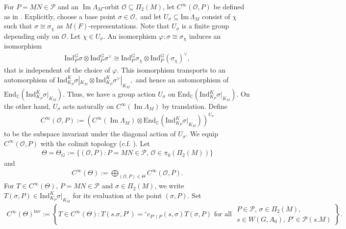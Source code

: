 \documentclass[10pt]{amsart}
\theoremstyle{definition}
\numberwithin{equation}{section}
\numberwithin{equation}{subsection}
\newcommand{\Ind}{\mathrm{Ind}}
\newcommand{\CC}{\mathbb{C}}
\renewcommand{\Im}{\mathop{\mathrm{Im}}}
\begin{document}
For $P=MN\in\mathcal{P}$ and an $\Im\Lambda_M$-orbit $\mathcal{O}\subseteq\Pi_2(M)$, let $C^\infty(\mathcal{O},P)$ be defined as in \cite[p.296]{Waldspurger:Plancherel}. Explicitly, choose a base point $\sigma\in \mathcal{O},$ and let $U_\sigma\subseteq \mathrm{Im}\, \Lambda_M$ consist of $\chi$ such that $\sigma\cong \sigma_\chi$ as $M(F)$-representations. Note that $U_\sigma$ is a finite group depending only on $\mathcal{O}$. Let $\chi\in U_\sigma.$ An isomorphism $\varphi:\sigma\cong \sigma_\chi$ induces an isomorphism 
\begin{align*}
    \mathrm{Ind}_P^G\sigma\otimes\Ind_P^{G} \sigma^\lor\cong \mathrm{Ind}_P^G \sigma_\chi\otimes \Ind_{P}^G(\sigma_\chi)^\lor,
\end{align*} 
that is independent of the choice of $\varphi.$ This isomorphism transports to an automorphism of $\Ind_{K_P}^K \sigma|_{K_M}\otimes \Ind_{K_P}^K \sigma^\lor|_{K_M},$ and hence an automorphism of $\mathrm{End}_\CC(\Ind_{K_P}^K \sigma|_{K_M}).$ Thus, we have a group action $U_\sigma$ on $\mathrm{End}_\CC(\Ind_{K_P}^K \sigma|_{K_M}).$ On the other hand, $U_\sigma$ acts naturally on $C^\infty(\Im\Lambda_M)$ by translation. Define
\begin{align*}
    C^\infty(\mathcal{O},P) := (C^\infty(\Im\Lambda_M)\otimes \mathrm{End}_\mathbb{C}(\Ind_{K_P}^K\sigma\vert_{K_M}))^{U_\sigma}
\end{align*}
to be the subspace invariant under the diagonal action of $U_\sigma$. We equip $C^\infty(\mathcal{O},P)$ with the colimit topology (c.f. \cite[VI.3, p.301]{Waldspurger:Plancherel}). Let
\begin{align*}
    \Theta = \Theta_G := \{(\mathcal{O},P) : P=MN\in\mathcal{P},\,\mathcal{O}\in \pi_0(\Pi_2(M))\}
\end{align*}
and
\begin{align*}
    C^\infty(\Theta) := \bigoplus_{(\mathcal{O},P)\in\Theta} C^\infty(\mathcal{O},P).
\end{align*}
For $T\in C^\infty(\Theta)$, $P=MN\in\mathcal{P}$ and $\sigma\in \Pi_2(M)$, we write $T(\sigma,P)\in\Ind_{K_P}^K\sigma\vert_{K_M}$ for its evaluation at the point $(\sigma,P)$. Set
\begin{align*}
    C^\infty(\Theta)^{\mathrm{inv}} := \left\{T\in C^\infty(\Theta) : T(s.\sigma,P') = {}^\circ c_{P'\mid P}(s,\sigma) T(\sigma,P)\text{ for all }\begin{array}{l}
         P\in\mathcal{P},\,\sigma\in\Pi_2(M),\\
         s\in W(G,A_0),\,P'\in\mathcal{P}(s.M) 
    \end{array}\right\}.
\end{align*}
\end{document}
